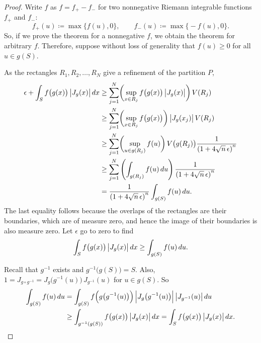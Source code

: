 \begin{proof}
Write $f$ as
$f = f_+ - f_-$ for two nonnegative Riemann integrable
functions $f_+$ and $f_-$:
\begin{equation*}
f_+(u) \coloneqq \max \bigl\{ f(u) , 0 \bigr\}, \qquad
f_-(u) \coloneqq \max \bigl\{ -f(u) , 0 \bigr\} .
\end{equation*}
So, if we prove the theorem for a nonnegative $f$,
we obtain the theorem for arbitrary $f$.
Therefore, suppose without loss of generality that 
$f(u) \geq 0$ for all $u \in g(S)$.

As the rectangles $R_1,R_2,\ldots,R_N$ give a refinement of
the partition $P$,
\begin{equation*}
\begin{split}
\epsilon + \int_S f\bigl(g(x)\bigr) \, \bigl\lvert {J_g(x)} \bigr\rvert \, dx
& \geq
\sum_{j=1}^N \biggl(\sup_{x \in R_j} f\bigl(g(x)\bigr) \, \bigl\lvert {J_g(x)} \bigr\rvert \biggr) \, V(R_j)
\\
& \geq
\sum_{j=1}^N \biggl(\sup_{x \in R_j} f\bigl(g(x)\bigr) \biggr) \, \bigl\lvert {J_g(x_j)} \bigr\rvert \, V(R_j)
\\
& \geq
\sum_{j=1}^N \biggl(\sup_{u \in g(R_j)} f(u) \biggr) \,
V\bigl(g(R_j)\bigr)
\frac{1}{{(1+4\sqrt{n} \, \epsilon)}^n}
\\
& \geq
\sum_{j=1}^N \left(\int_{g(R_j)}f(u) \,du \right)
\frac{1}{{(1+4\sqrt{n} \, \epsilon)}^n}
\\
& =
\frac{1}{{(1+4\sqrt{n} \, \epsilon)}^n}
\int_{g(S)} f(u) \,du .
\end{split}
\end{equation*}
The last equality follows because the overlaps of the rectangles
are their boundaries, which are of measure zero, and hence the image
of their boundaries is also measure zero.
Let $\epsilon$ go to zero to find
\begin{equation*}
\int_S f\bigl(g(x)\bigr) \, \bigl\lvert {J_g(x)} \bigr\rvert \, dx \geq \int_{g(S)} f(u) \,du .
\end{equation*}

Recall that $g^{-1}$ exists and $g^{-1}\bigl(g(S)\bigr) = S$.
Also, $1 = J_{g\circ g^{-1}} = J_g\bigl(g^{-1}(u)\bigr) \,J_{g^{-1}}(u)$ for $u \in g(S)$.
So
\begin{equation*}
\begin{split}
\int_{g(S)} f(u) \, du
& =
\int_{g(S)} f\Bigl(g\bigl(g^{-1}(u)\bigr)\Bigr) \,
\Bigl\lvert {J_g\bigl(g^{-1}(u)\bigr)} \Bigr\rvert \, \bigl\lvert {J_{g^{-1}}(u)} \bigr\rvert \, du
\\
& \geq
\int_{g^{-1}(g(S))} f\bigl(g(x)\bigr) \, \bigl\lvert {J_g(x)} \bigr\rvert \, dx
=
\int_{S} f\bigl(g(x)\bigr) \, \bigl\lvert {J_g(x)} \bigr\rvert \, dx .
\qedhere
\end{split}
\end{equation*}
\end{proof}

